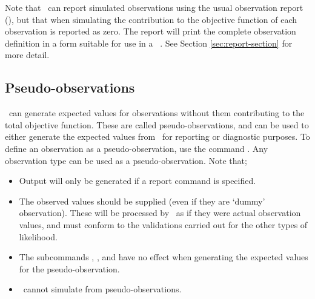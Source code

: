 Note that \SPM\ can report simulated observations using the usual observation report (), but that when simulating the contribution to the objective function of each observation is reported as zero. The report  will print the complete observation definition in a form suitable for use in a \SPM\ \config. See Section \ref{sec:report-section} for more detail.

\subsection{Pseudo-observations}

\SPM\ can generate expected values for observations without them contributing to the total objective function. These are called pseudo-observations, and can be used to either generate the expected values from \SPM\ for reporting or diagnostic purposes. To define an observation as a pseudo-observation, use the command . Any observation type can be used as a pseudo-observation. Note that;

\begin{itemize}
  \item Output will only be generated if a report command  is specified.
  \item The observed values should be supplied (even if they are `dummy' observation). These will be processed by \SPM\ as if they were actual observation values, and must conform to the validations carried out for the other types of likelihood. 
  \item The subcommands , ,  and  have no effect when generating the expected values for the pseudo-observation.   
  \item \SPM\ cannot simulate from pseudo-observations.
\end{itemize}
